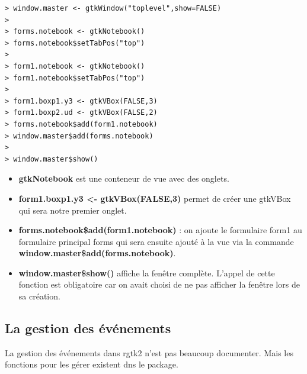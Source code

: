 \begin{lstlisting}
> window.master <- gtkWindow("toplevel",show=FALSE)
> 
> forms.notebook <- gtkNotebook()
> forms.notebook$setTabPos("top")
> 
> form1.notebook <- gtkNotebook()
> form1.notebook$setTabPos("top")
> 
> form1.boxp1.y3 <- gtkVBox(FALSE,3)
> form1.boxp2.ud <- gtkVBox(FALSE,2)
> forms.notebook$add(form1.notebook)
> window.master$add(forms.notebook)
> 
> window.master$show()

\end{lstlisting}

\begin{itemize}
\item \textbf{gtkNotebook} est une conteneur de vue avec des onglets. \\
\item \textbf{form1.boxp1.y3 <- gtkVBox(FALSE,3)} permet de créer une gtkVBox qui sera notre premier onglet. \\
\item \textbf{forms.notebook\$add(form1.notebook)} : on ajoute le formulaire form1 au formulaire principal forms qui sera ensuite ajouté à la vue via la commande \textbf{window.master\$add(forms.notebook)}. \\
\item \textbf{window.master\$show()} affiche la fenêtre complète. L'appel de cette fonction est obligatoire car on avait choisi de ne pas afficher la fenêtre lors de sa création. 
\end{itemize}

\subsection{La gestion des événements}
La gestion des événements dans rgtk2 n'est pas beaucoup documenter. Mais les fonctions pour les gérer existent dns le package. 




